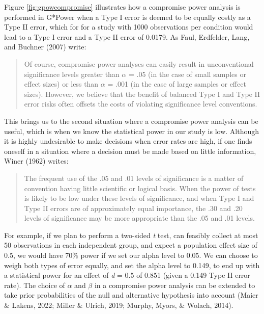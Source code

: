 \documentclass[
  english,
  ,jou,floatsintext]{apa6}
\begin{document}
Figure \ref{fig:gpowcompromise} illustrates how a compromise power analysis is performed in G*Power when a Type I error is deemed to be equally costly as a Type II error, which for for a study with 1000 observations per condition would lead to a Type I error and a Type II error of 0.0179. As Faul, Erdfelder, Lang, and Buchner (2007) write:

\begin{quote}
Of course, compromise power analyses can easily result in unconventional significance levels greater than \(\alpha\) = .05 (in the case of small samples or effect sizes) or less than \(\alpha\) = .001 (in the case of large samples or effect sizes). However, we believe that the benefit of balanced Type I and Type II error risks often offsets the costs of violating significance level conventions.
\end{quote}

This brings us to the second situation where a compromise power analysis can be useful, which is when we know the statistical power in our study is low. Although it is highly undesirable to make decisions when error rates are high, if one finds oneself in a situation where a decision must be made based on little information, Winer (1962) writes:

\begin{quote}
The frequent use of the .05 and .01 levels of significance is a matter of convention having little scientific or logical basis. When the power of tests is likely to be low under these levels of significance, and when Type I and Type II errors are of approximately equal importance, the .30 and .20 levels of significance may be more appropriate than the .05 and .01 levels.
\end{quote}

For example, if we plan to perform a two-sided \emph{t} test, can feasibly collect at most 50 observations in each independent group, and expect a population effect size of 0.5, we would have 70\% power if we set our alpha level to 0.05. We can choose to weigh both types of error equally, and set the alpha level to 0.149, to end up with a statistical power for an effect of \emph{d} = 0.5 of 0.851 (given a 0.149 Type II error rate). The choice of \(\alpha\) and \(\beta\) in a compromise power analysis can be extended to take prior probabilities of the null and alternative hypothesis into account (Maier \& Lakens, 2022; Miller \& Ulrich, 2019; Murphy, Myors, \& Wolach, 2014).
\end{document}
